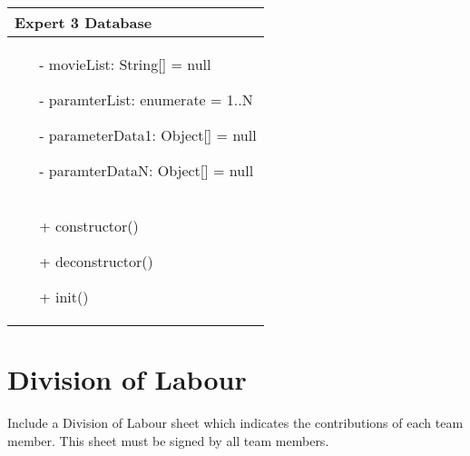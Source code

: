 \documentclass[]{article}
\begin{document}
\begin{table}[H]
\centering
\begin{tabular}{|>{\centering\arraybackslash}p{10cm}|}
\hline
Expert 3 Database\\
\hline
\begin{itemize}
\item[-] movieList: String[] = null
\item[-] paramterList: enumerate = 1..N
\item[-] parameterData1: Object[] = null
\item[-] paramterDataN: Object[] = null
\end{itemize}
\\
\hline
\begin{itemize}
\item[+] constructor()
\item[+] deconstructor()
\item[+] init()
\end{itemize}
\\
\hline
\end{tabular}
\end{table}

\appendix
\section{Division of Labour}
\label{sec:division_of_labour}
Include a Division of Labour sheet which indicates the contributions of each team member. This sheet must be signed by all team members.

\newpage
\end{document}
